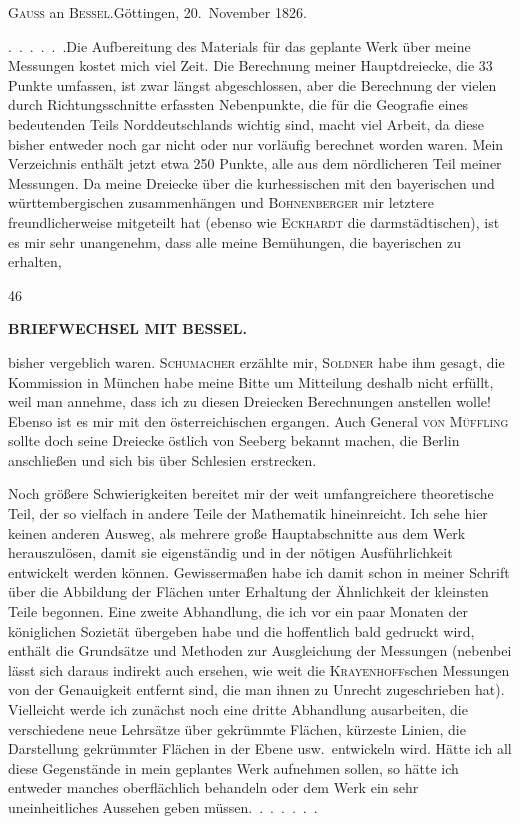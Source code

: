 \begin{center}
\textsc{Gauss} an \textsc{Bessel}.\quad Göttingen, 20.~November 1826.
\end{center}

\par\noindent\hspace*{\parindent}.\ .\ .\ .\ .\ .\quad Die Aufbereitung des Materials für das geplante Werk über meine Messungen kostet mich viel Zeit.
Die Berechnung meiner Hauptdreiecke, die 33 Punkte umfassen, ist zwar längst abgeschlossen, aber die Berechnung der vielen durch Richtungsschnitte erfassten Nebenpunkte, die für die Geografie eines bedeutenden Teils Norddeutschlands wichtig sind, macht viel Arbeit, da diese bisher entweder noch gar nicht oder nur vorläufig berechnet worden waren.
Mein Verzeichnis enthält jetzt etwa 250 Punkte, alle aus dem nördlicheren Teil meiner Messungen.
Da meine Dreiecke über die kurhessischen mit den bayerischen und württembergischen zusammenhängen und \textsc{Bohnenberger} mir letztere freundlicherweise mitgeteilt hat (ebenso wie \textsc{Eckhardt} die darmstädtischen), ist es mir sehr unangenehm, dass alle meine Bemühungen, die bayerischen zu erhalten,
\par\smallskip{}\hfill{\footnotesize46}\par
\clearpage
{}\hfill{\small\textbf{BRIEFWECHSEL MIT BESSEL.}}\par\medskip
\noindent bisher vergeblich waren. \textsc{Schumacher} erzählte mir, \textsc{Soldner} habe ihm gesagt, die Kommission in München habe meine Bitte um Mitteilung deshalb nicht erfüllt, weil man annehme, dass ich zu diesen Dreiecken Berechnungen anstellen wolle!
Ebenso ist es mir mit den österreichischen ergangen.
Auch General \textsc{von Müffling} sollte doch seine Dreiecke östlich von Seeberg bekannt machen, die Berlin anschließen und sich bis über Schlesien erstrecken.

\par\noindent\hspace*{\parindent}Noch größere Schwierigkeiten bereitet mir der weit umfangreichere theoretische Teil, der so vielfach in andere Teile der Mathematik hineinreicht.
Ich sehe hier keinen anderen Ausweg, als mehrere große Hauptabschnitte aus dem Werk herauszulösen, damit sie eigenständig und in der nötigen Ausführlichkeit entwickelt werden können.
Gewissermaßen habe ich damit schon in meiner Schrift über die Abbildung der Flächen unter Erhaltung der Ähnlichkeit der kleinsten Teile begonnen. Eine zweite Abhandlung, die ich vor ein paar Monaten der königlichen Sozietät übergeben habe und die hoffentlich bald gedruckt wird, enthält die Grundsätze und Methoden zur Ausgleichung der Messungen (nebenbei lässt sich daraus indirekt auch ersehen, wie weit die \textsc{Krayenhoff}schen Messungen von der Genauigkeit entfernt sind, die man ihnen zu Unrecht zugeschrieben hat).
Vielleicht werde ich zunächst noch eine dritte Abhandlung ausarbeiten, die verschiedene neue Lehrsätze über gekrümmte Flächen, kürzeste Linien, die Darstellung gekrümmter Flächen in der Ebene usw.\ entwickeln wird.
Hätte ich all diese Gegenstände in mein geplantes Werk aufnehmen sollen, so hätte ich entweder manches oberflächlich behandeln oder dem Werk ein sehr uneinheitliches Aussehen geben müssen.\ .\ .\ .\ .\ .\ .
